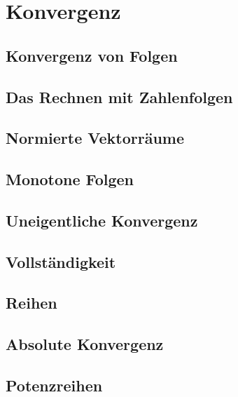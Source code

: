 \chapter{Konvergenz}
\section{Konvergenz von Folgen}
\section{Das Rechnen mit Zahlenfolgen}
\section{Normierte Vektorräume}
\section{Monotone Folgen}
\section{Uneigentliche Konvergenz}
\section{Vollständigkeit}
\section{Reihen}
\section{Absolute Konvergenz}
\section{Potenzreihen}

